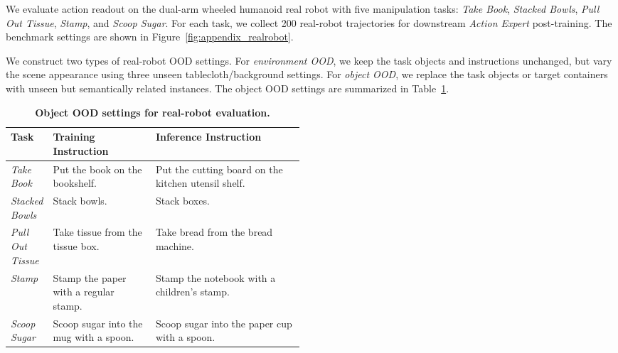 \documentclass{llmxive}
\providecommand{\arraystretch}{1.12}
\begin{document}
We evaluate action readout on the dual-arm wheeled humanoid real robot with five manipulation tasks: \textit{Take Book}, \textit{Stacked Bowls}, \textit{Pull Out Tissue}, \textit{Stamp}, and \textit{Scoop Sugar}. 
For each task, we collect 200 real-robot trajectories for downstream \textit{Action Expert} post-training. 
The benchmark settings are shown in Figure~\ref{fig:appendix_realrobot}.

We construct two types of real-robot OOD settings. 
For \textit{environment OOD}, we keep the task objects and instructions unchanged, but vary the scene appearance using three unseen tablecloth/background settings. 
For \textit{object OOD}, we replace the task objects or target containers with unseen but semantically related instances. 
The object OOD settings are summarized in Table~\ref{tab:appendix_object_ood_settings}.


\begin{table}[!htbp]
  \centering
  \small
  \setlength{\tabcolsep}{4pt}
  \renewcommand{\arraystretch}{1.08}
  \begin{tabularx}{\linewidth}{
    @{}
    >{\arraybackslash}p{0.13\linewidth}
    >{\arraybackslash}p{0.35\linewidth}
    >{\arraybackslash}X
    @{}
  }
    \toprule[1pt]
    \textbf{Task} & \textbf{Training Instruction} & \textbf{Inference Instruction} \\
    \midrule[0.5pt]
    \textit{Take Book} 
    & Put the book on the bookshelf. 
    & Put the cutting board on the kitchen utensil shelf. \\

    \textit{Stacked Bowls} 
    & Stack bowls. 
    & Stack boxes. \\

    \textit{Pull Out Tissue} 
    & Take tissue from the tissue box. 
    & Take bread from the bread machine. \\

    \textit{Stamp} 
    & Stamp the paper with a regular stamp. 
    & Stamp the notebook with a children's stamp. \\

    \textit{Scoop Sugar} 
    & Scoop sugar into the mug with a spoon. 
    & Scoop sugar into the paper cup with a spoon. \\
    \bottomrule[1pt]
  \end{tabularx}
\caption{\textbf{Object OOD settings for real-robot evaluation.}}
\label{tab:appendix_object_ood_settings}
\end{table}
\end{document}

